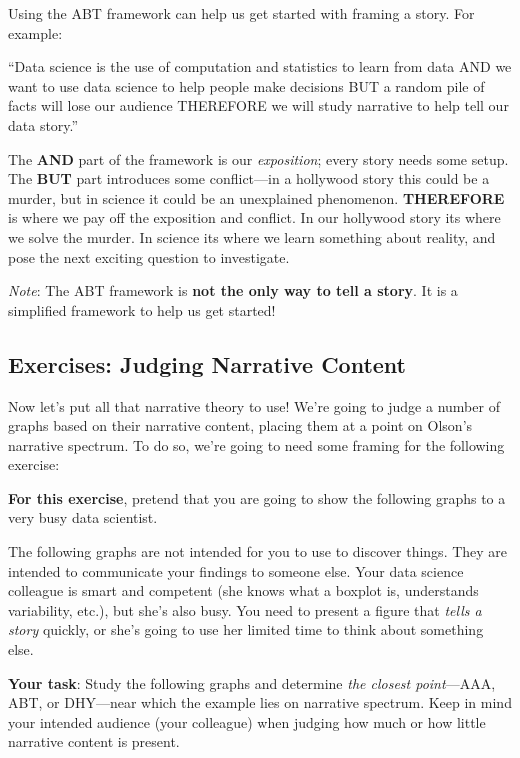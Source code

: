 \documentclass[
]{article}
\begin{document}
Using the ABT framework can help us get started with framing a story.
For example:

``Data science is the use of computation and statistics to learn from
data AND we want to use data science to help people make decisions BUT a
random pile of facts will lose our audience THEREFORE we will study
narrative to help tell our data story.''

The \textbf{AND} part of the framework is our \emph{exposition}; every
story needs some setup. The \textbf{BUT} part introduces some
conflict---in a hollywood story this could be a murder, but in science
it could be an unexplained phenomenon. \textbf{THEREFORE} is where we
pay off the exposition and conflict. In our hollywood story its where we
solve the murder. In science its where we learn something about reality,
and pose the next exciting question to investigate.

\emph{Note}: The ABT framework is \textbf{not the only way to tell a
story}. It is a simplified framework to help us get started!

\hypertarget{exercises-judging-narrative-content}{%
\subsection{Exercises: Judging Narrative
Content}\label{exercises-judging-narrative-content}}

Now let's put all that narrative theory to use! We're going to judge a
number of graphs based on their narrative content, placing them at a
point on Olson's narrative spectrum. To do so, we're going to need some
framing for the following exercise:

\textbf{For this exercise}, pretend that you are going to show the
following graphs to a very busy data scientist.

The following graphs are not intended for you to use to discover things.
They are intended to communicate your findings to someone else. Your
data science colleague is smart and competent (she knows what a boxplot
is, understands variability, etc.), but she's also busy. You need to
present a figure that \emph{tells a story} quickly, or she's going to
use her limited time to think about something else.

\textbf{Your task}: Study the following graphs and determine \emph{the
closest point}---AAA, ABT, or DHY---near which the example lies on
narrative spectrum. Keep in mind your intended audience (your colleague)
when judging how much or how little narrative content is present.
\end{document}
